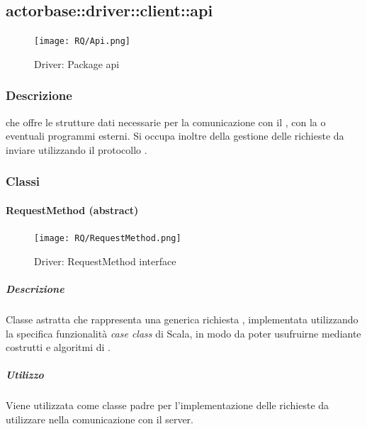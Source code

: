 \documentclass{scalatekids-article}
\begin{document}


\subsection{actorbase::driver::client::api}
\label{sec:actorbase::driver::client::api}

\begin{figure}[H]
  \begin{center}
    \texttt{[image: RQ/Api.png]}
    \caption{Driver: Package api}
  \end{center}
\end{figure}

\subsubsection{Descrizione}

 che offre le strutture dati necessarie per la comunicazione con
il , con la  o eventuali programmi esterni. Si occupa
inoltre della gestione delle richieste  da inviare utilizzando il
protocollo .

\subsubsection{Classi}

\paragraph{RequestMethod (abstract)}
\label{sec:actorbase::driver::client::api::RequestMethod}

\begin{figure}[H]
  \begin{center}
    \texttt{[image: RQ/RequestMethod.png]}
    \caption{Driver: RequestMethod interface}
  \end{center}
\end{figure}

\subparagraph{Descrizione}

Classe astratta che rappresenta una generica richiesta ,
implementata utilizzando la specifica funzionalità \textit{case class} di Scala,
in modo da poter usufruirne mediante costrutti e algoritmi di .

\subparagraph{Utilizzo}

Viene utilizzata come classe padre per l'implementazione delle richieste
 da utilizzare nella comunicazione con il server.
\end{document}
